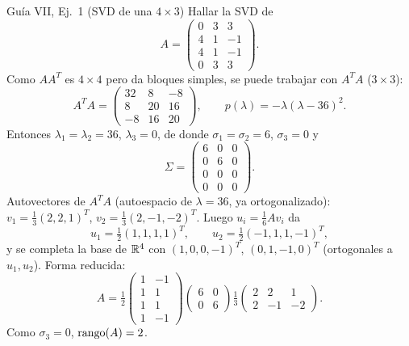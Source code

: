 \begin{ejemplo}{Guía VII, Ej.\ 1 (SVD de una $4\times3$)}
Hallar la SVD de
\[
A=\begin{pmatrix} 0 & 3 & 3 \\ 4 & 1 & -1 \\ 4 & 1 & -1 \\ 0 & 3 & 3 \end{pmatrix}.
\]
Como $AA^T$ es $4\times4$ pero da bloques simples, se puede trabajar con $A^TA$ ($3\times3$):
\[
A^TA=\begin{pmatrix} 32 & 8 & -8 \\ 8 & 20 & 16 \\ -8 & 16 & 20 \end{pmatrix},
\qquad
p(\lambda)=-\lambda(\lambda-36)^2 .
\]
Entonces $\lambda_1=\lambda_2=36$, $\lambda_3=0$, de donde $\sigma_1=\sigma_2=6$, $\sigma_3=0$ y
\[
\Sigma=\begin{pmatrix} 6 & 0 & 0 \\ 0 & 6 & 0 \\ 0 & 0 & 0 \\ 0 & 0 & 0 \end{pmatrix}.
\]
Autovectores de $A^TA$ (autoespacio de $\lambda=36$, ya ortogonalizado): $v_1=\tfrac13(2,2,1)^T$, $v_2=\tfrac13(2,-1,-2)^T$. Luego $u_i=\tfrac1{6}Av_i$ da
\[
u_1=\tfrac12(1,1,1,1)^T,\qquad u_2=\tfrac12(-1,1,1,-1)^T,
\]
y se completa la base de $\mathbb{R}^4$ con $(1,0,0,-1)^T$, $(0,1,-1,0)^T$ (ortogonales a $u_1,u_2$). Forma reducida:
\[
A=\tfrac12\begin{pmatrix} 1 & -1 \\ 1 & 1 \\ 1 & 1 \\ 1 & -1 \end{pmatrix}
\begin{pmatrix} 6 & 0 \\ 0 & 6 \end{pmatrix}
\tfrac13\begin{pmatrix} 2 & 2 & 1 \\ 2 & -1 & -2 \end{pmatrix}.
\]
Como $\sigma_3=0$, $\operatorname{rango}(A)=2$.
\end{ejemplo}

